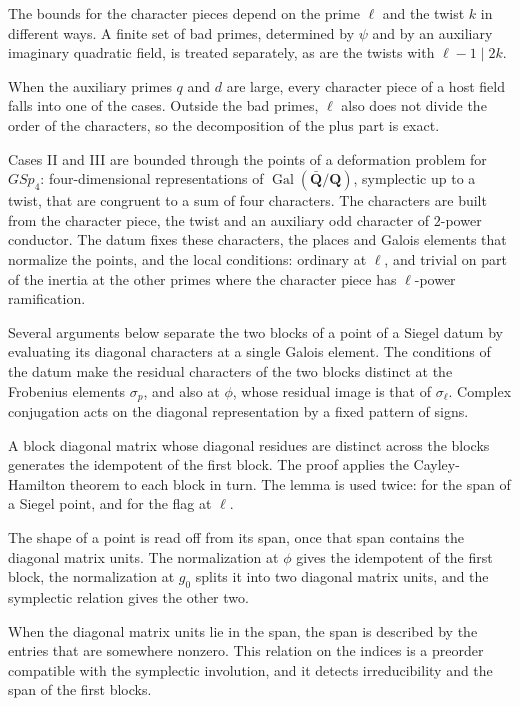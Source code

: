 The bounds for the character pieces depend on the prime $\ell$ and the twist $k$ in different ways. A finite set of bad primes, determined by $\psi$ and by an auxiliary imaginary quadratic field, is treated separately, as are the twists with $\ell-1\mid2k$.

When the auxiliary primes $q$ and $d$ are large, every character piece of a host field falls into one of the cases. Outside the bad primes, $\ell$ also does not divide the order of the characters, so the decomposition of the plus part is exact.

Cases II and III are bounded through the points of a deformation problem for $GSp_4$: four-dimensional representations of $\operatorname{Gal}(\bar{\mathbf Q}/\mathbf Q)$, symplectic up to a twist, that are congruent to a sum of four characters. The characters are built from the character piece, the twist and an auxiliary odd character of $2$-power conductor. The datum fixes these characters, the places and Galois elements that normalize the points, and the local conditions: ordinary at $\ell$, and trivial on part of the inertia at the other primes where the character piece has $\ell$-power ramification.

Several arguments below separate the two blocks of a point of a Siegel datum by evaluating its diagonal characters at a single Galois element. The conditions of the datum make the residual characters of the two blocks distinct at the Frobenius elements $\sigma_p$, and also at $\phi$, whose residual image is that of $\sigma_\ell$. Complex conjugation acts on the diagonal representation by a fixed pattern of signs.

A block diagonal matrix whose diagonal residues are distinct across the blocks generates the idempotent of the first block. The proof applies the Cayley-Hamilton theorem to each block in turn. The lemma is used twice: for the span of a Siegel point, and for the flag at $\ell$.

The shape of a point is read off from its span, once that span contains the diagonal matrix units. The normalization at $\phi$ gives the idempotent of the first block, the normalization at $g_0$ splits it into two diagonal matrix units, and the symplectic relation gives the other two.

When the diagonal matrix units lie in the span, the span is described by the entries that are somewhere nonzero. This relation on the indices is a preorder compatible with the symplectic involution, and it detects irreducibility and the span of the first blocks.


